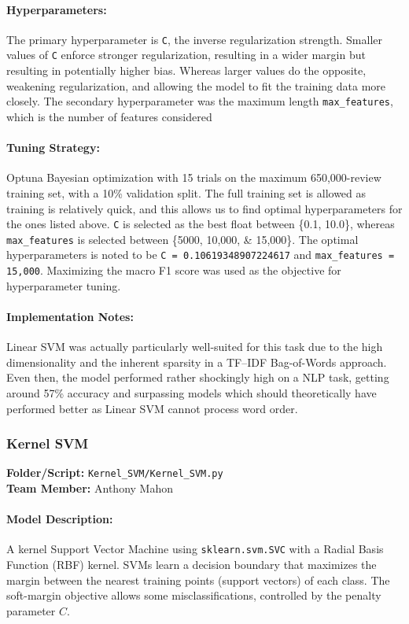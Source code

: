 \documentclass[12pt]{article}
\begin{document}
\paragraph{Hyperparameters:} The primary hyperparameter is \texttt{C}, the inverse regularization strength. Smaller values of \texttt{C} enforce stronger regularization, resulting in a wider margin but resulting in potentially higher bias. Whereas larger values do the opposite, weakening regularization, and allowing the model to fit the training data more closely. The secondary hyperparameter was the maximum length \texttt{max\_features}, which is the number of features considered


\paragraph{Tuning Strategy:} Optuna Bayesian optimization with 15 trials on the maximum 650,000-review training set, with a 10\% validation split. The full training set is allowed as training is relatively quick, and this allows us to find optimal hyperparameters for the ones listed above. \texttt{C} is selected as the best float between \{0.1, 10.0\}, whereas \texttt{max\_features} is selected between \{5000, 10,000, \& 15,000\}. The optimal hyperparameters is noted to be \texttt{C = 0.10619348907224617} and \texttt{max\_features = 15,000}. Maximizing the macro F1 score was used as the objective for hyperparameter tuning.


\paragraph{Implementation Notes:} Linear SVM was actually particularly well-suited for this task due to the high dimensionality and the inherent sparsity in a TF--IDF Bag-of-Words approach. Even then, the model performed rather shockingly high on a NLP task, getting around 57\% accuracy and surpassing models which should theoretically have performed better as Linear SVM cannot process word order.

\newpage

\subsubsection{Kernel SVM}
\textbf{Folder/Script:} \texttt{Kernel\_SVM/Kernel\_SVM.py}\\
\textbf{Team Member:} Anthony Mahon
 
\paragraph{Model Description:}
A kernel Support Vector Machine using \texttt{sklearn.svm.SVC} with a Radial Basis Function (RBF) kernel. SVMs learn a decision boundary that maximizes the margin between the nearest training points (support vectors) of each class. The soft-margin objective allows some misclassifications, controlled by the penalty parameter $C$.
\end{document}

